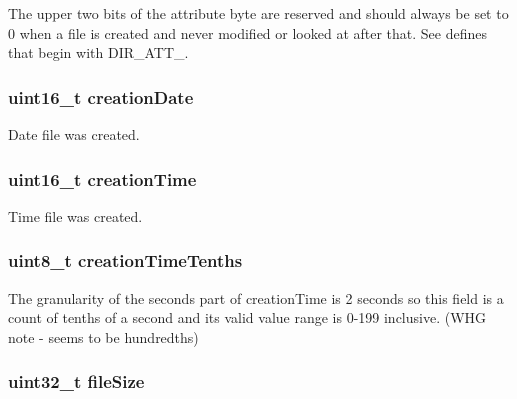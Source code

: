 The upper two bits of the attribute byte are reserved and should always be set to 0 when a file is created and never modified or looked at after that. See defines that begin with D\-I\-R\-\_\-\-A\-T\-T\-\_\-. \hypertarget{structdirectory_entry_ab00be6268bf4c4f4b6014f056e27ba45}{
\subsubsection[{creation\-Date}]{\setlength{\rightskip}{0pt plus 5cm}uint16\-\_\-t creation\-Date}}\label{structdirectory_entry_ab00be6268bf4c4f4b6014f056e27ba45}
Date file was created. \hypertarget{structdirectory_entry_a2b2b18a3fb988470278b1217abe946ab}{
\subsubsection[{creation\-Time}]{\setlength{\rightskip}{0pt plus 5cm}uint16\-\_\-t creation\-Time}}\label{structdirectory_entry_a2b2b18a3fb988470278b1217abe946ab}
Time file was created. \hypertarget{structdirectory_entry_a088ac767e59feb38599e0a53e6aacb82}{
\subsubsection[{creation\-Time\-Tenths}]{\setlength{\rightskip}{0pt plus 5cm}uint8\-\_\-t creation\-Time\-Tenths}}\label{structdirectory_entry_a088ac767e59feb38599e0a53e6aacb82}
The granularity of the seconds part of creation\-Time is 2 seconds so this field is a count of tenths of a second and its valid value range is 0-\/199 inclusive. (W\-H\-G note -\/ seems to be hundredths) \hypertarget{structdirectory_entry_a48f46ad02b77a00b795d15626ba1d42e}{
\subsubsection[{file\-Size}]{\setlength{\rightskip}{0pt plus 5cm}uint32\-\_\-t file\-Size}}\label{structdirectory_entry_a48f46ad02b77a00b795d15626ba1d42e}
